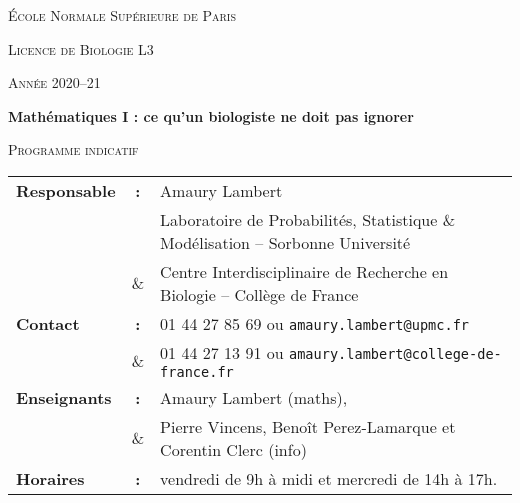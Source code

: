 \documentclass[11pt]{article}
\begin{document}
\begin{center}
\textsc{\'Ecole Normale Sup\'erieure de Paris} 

\vspace{0.2cm}

\textsc{Licence de Biologie L3} 

\vspace{0.2cm}

\textsc{Ann\'ee 2020--21}

\vspace{0.8cm}

\large\textbf{Math\'ematiques I : ce qu'un biologiste ne doit pas ignorer}

\vspace{0.8cm}

\normalsize

\textsc{Programme indicatif}



\end{center} 


\vspace{1cm}

\begin{tabular}{lcl}
\textbf{Responsable} &{\bf :}& Amaury Lambert\\
 & &Laboratoire de Probabilit\'es, Statistique \& Mod\'elisation -- Sorbonne Universit\'e  \\
 & \&&  Centre Interdisciplinaire de Recherche en Biologie -- Coll\`ege de France\\
 \textbf{Contact }&{\bf :}& 01 44 27 85 69 ou \texttt{amaury.lambert@upmc.fr}\\
 & \&& 01 44 27 13 91 ou \texttt{amaury.lambert@college-de-france.fr}\\
\textbf{Enseignants }&{\bf :}& Amaury Lambert (maths),\\
	&\&&Pierre Vincens, Beno\^it Perez-Lamarque et Corentin Clerc (info)\\
\textbf{Horaires }&{\bf :}& vendredi de 9h \`a midi et mercredi de 14h \`a 17h.
 \end{tabular}
 


\vspace{1.7cm}
 
\end{document}
